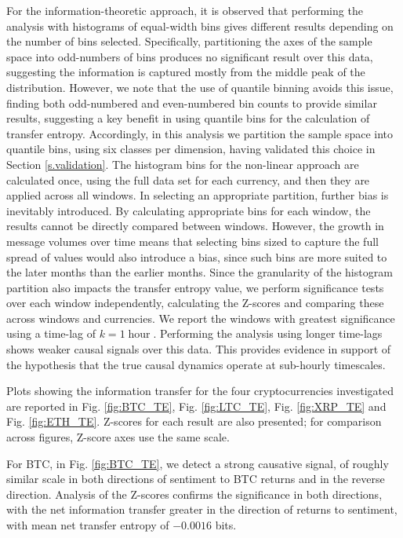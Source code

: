 \documentclass[]{rsos}%
\begin{document}
  For the information-theoretic approach, it is observed that performing the analysis with histograms of equal-width bins gives different results depending on the number of bins selected. Specifically, partitioning the axes of the sample space into odd-numbers of bins produces no significant result over this data, suggesting the information is captured mostly from the middle peak of the distribution. However, we note that the use of quantile binning avoids this issue, finding both odd-numbered and even-numbered bin counts to provide similar results, suggesting a key benefit in using quantile bins for the calculation of transfer entropy. Accordingly, in this analysis we partition the sample space into quantile bins, using six classes per dimension, having validated this choice in Section \ref{s.validation}. The histogram bins for the non-linear approach are calculated once, using the full data set for each currency, and then they are applied across all windows. In selecting an appropriate partition, further bias is inevitably introduced. By calculating appropriate bins for each window, the results cannot be directly compared between windows. However, the growth in message volumes over time means that selecting bins sized to capture the full spread of values would also introduce a bias, since such bins are more suited to the later months than the earlier months. Since the granularity of the histogram partition also impacts the transfer entropy value, we perform significance tests over each window independently, calculating the Z-scores and comparing these across windows and currencies.  We report the windows with greatest significance using a time-lag of $k=1\operatorname{hour}$. Performing the analysis using longer time-lags shows weaker causal signals over this data. This provides evidence in support of the hypothesis that the true causal dynamics operate at sub-hourly timescales.

  Plots showing the information transfer for the four cryptocurrencies investigated are reported in Fig. \ref{fig:BTC_TE}, Fig. \ref{fig:LTC_TE}, Fig. \ref{fig:XRP_TE} and Fig. \ref{fig:ETH_TE}. Z-scores for each result are also presented; for comparison across figures, Z-score axes  use the same scale.
  
  For BTC, in Fig. \ref{fig:BTC_TE}, we detect a strong causative signal, of roughly similar scale in both directions of sentiment to BTC {\color{blue} returns} and in the reverse direction. Analysis of the Z-scores confirms the significance in both directions, with the net information transfer greater in the direction of {\color{blue} returns} to sentiment, with mean net transfer entropy of $-0.0016$ bits.
  
\end{document}
